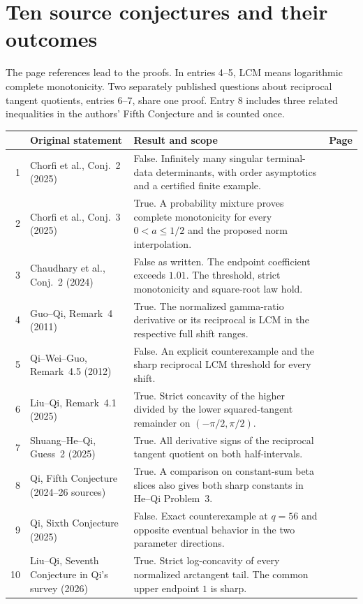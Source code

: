 \documentclass[11pt,a4paper]{article}
\numberwithin{equation}{section}
\begin{document}
\section{Ten source conjectures and their outcomes}
The page references lead to the proofs. In entries 4--5, LCM means
logarithmic complete monotonicity. Two separately published questions
about reciprocal tangent quotients, entries 6--7, share one proof.
Entry 8 includes three related inequalities in the authors' Fifth
Conjecture and is counted once.
\smallskip
\begin{center}\small
\begin{tabular}{@{}r>{\raggedright\arraybackslash}p{}>{\raggedright\arraybackslash}p{}r@{}}
\toprule
& Original statement & Result and scope & Page\\
\midrule
1 & Chorfi et al., Conj.~2 (2025) & False. Infinitely many singular terminal-data determinants, with order asymptotics and a certified finite example. & \pageref{sec:wronskian}\\[5pt]
2 & Chorfi et al., Conj.~3 (2025) & True. A probability mixture proves complete monotonicity for every $0<a\le1/2$ and the proposed norm interpolation. & \pageref{sec:schrod3}\\[5pt]
3 & Chaudhary et al., Conj.~2 (2024) & False as written. The endpoint coefficient exceeds $1.01$. The threshold, strict monotonicity and square-root law hold. & \pageref{sec:drift}\\[5pt]
4 & Guo--Qi, Remark~4 (2011) & True. The normalized gamma-ratio derivative or its reciprocal is LCM in the respective full shift ranges. & \pageref{sec:gqderiv}\\[5pt]
5 & Qi--Wei--Guo, Remark~4.5 (2012) & False. An explicit counterexample and the sharp reciprocal LCM threshold for every shift. & \pageref{sec:qwg}\\[5pt]
6 & Liu--Qi, Remark~4.1 (2025) & True. Strict concavity of the higher divided by the lower squared-tangent remainder on $(-\pi/2,\pi/2)$. & \pageref{sec:tan-tails}\\[5pt]
7 & Shuang--He--Qi, Guess~2 (2025) & True. All derivative signs of the reciprocal tangent quotient on both half-intervals. & \pageref{sec:tan-tails}\\[5pt]
8 & Qi, Fifth Conjecture (2024--26 sources) & True. A comparison on constant-sum beta slices also gives both sharp constants in He--Qi Problem~3. & \pageref{sec:hqmajor}\\[5pt]
9 & Qi, Sixth Conjecture (2025) & False. Exact counterexample at $q=56$ and opposite eventual behavior in the two parameter directions. & \pageref{qi6:sec}\\[5pt]
10 & Liu--Qi, Seventh Conjecture in Qi's survey (2026) & True. Strict log-concavity of every normalized arctangent tail. The common upper endpoint $1$ is sharp. & \pageref{sec:qi-seventh}\\
\bottomrule
\end{tabular}\end{center}
\end{document}
